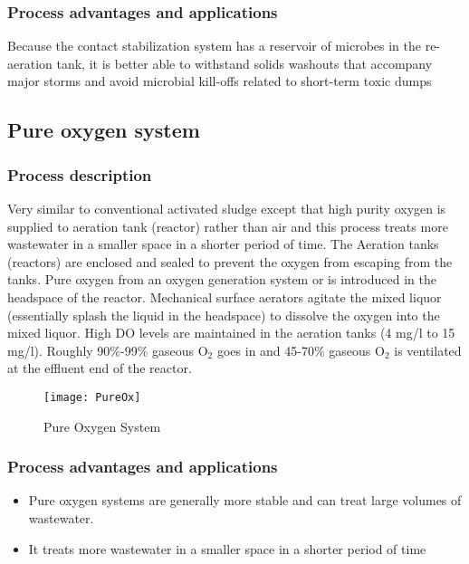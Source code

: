 \subsubsection{Process advantages and applications}
Because the contact stabilization system has a reservoir of microbes in the re-aeration tank, it is better able to withstand solids washouts that accompany major storms and avoid microbial kill-offs related to short-term toxic dumps

		\subsection{Pure oxygen system}


\subsubsection{Process description}
\noindent Very similar to conventional activated sludge except that high purity oxygen is supplied to aeration tank (reactor) rather than air and this process treats more wastewater in a smaller space in a shorter period of time.  The Aeration tanks (reactors) are enclosed and sealed to prevent the oxygen from escaping from the tanks.  Pure oxygen from an oxygen generation system or is introduced in the headspace of the reactor.  Mechanical surface aerators agitate the mixed liquor (essentially splash the liquid in the headspace) to dissolve the oxygen into the mixed liquor.  High DO levels are maintained in the aeration tanks (4 mg/l to 15 mg/l).  Roughly 90\%-99\% gaseous O$_2$ goes in and 45-70\% gaseous O$_2$ is ventilated at the effluent end of the reactor.\\

\begin{figure}[h!]
\begin{center}
\texttt{[image: PureOx]}
\caption{Pure Oxygen System}
\end{center}
\end{figure}

\subsubsection{Process advantages and applications}
\begin{itemize}
\item 
Pure oxygen systems are generally more stable and can treat large volumes of wastewater.  
\item It treats more wastewater in a smaller space in a shorter period of time
\end{itemize}



